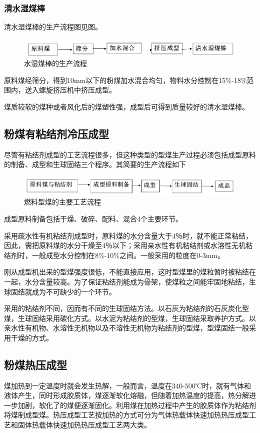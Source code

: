 \documentclass[10pt,openany]{ctexbook}
\begin{document}
\subsubsection{清水湿煤棒}
清水湿煤棒的生产流程图见图。
    \begin{figure}[!ht]
\includegraphics[scale=0.6]{26}
\caption{水湿煤棒的生产流程}
\end{figure}
原料煤经筛分，得到10mm以下的粉煤加水混合均匀，物料水分控制在15\%-18\%范围内，送入螺旋挤压机中挤压成型。\par
煤质较软的煤种或者风化后的煤塑性强，成型后可得到质量较好的清水湿煤棒。

 \subsection{粉煤有粘结剂冷压成型}
尽管有粘结剂成型的工艺流程很多，但这种类型的型煤生产过程必须包括成型原料的制备、成型和生球固结三个程序。其简要的生产流程如下
    \begin{figure}[!ht]
\includegraphics[scale=0.6]{27}
\caption{燃料型煤的主要工艺流程}
\end{figure}
成型原料制备包括干燥、破碎、配料、混合4个主要环节。 \par
采用疏水性有机粘结剂成型时，原料煤的水分含量大于4％时，就不能正常粘结，因此，需把原料煤的水分干燥至4％以下；采用亲水性有机粘结剂或水溶性无机粘结剂时，一般成型水分控制在8\%-10\%之间。一般采用的粒度在0-3mm。\par
    刚从成型机出来的型煤强度很低，不能直接应用，这时型煤里的煤粒暂时被粘结在一起，水分含量较高。为了保证粘结剂能成为骨架，使煤粒之间能牢固地粘结，生球固结就成为不可缺少的一个环节。\par
    采用的粘结剂不同，因而有不同的生球固结方法。以石灰为粘结剂的石灰炭化型煤，生球固结采用碳化方式。以水泥为粘结剂的型煤，生球固结采取养护方式。以亲水性有机物、水溶性无机物以及不溶性无机物为粘结剂的型煤，型煤固结一般采用干燥的方式。
 \subsection{粉煤热压成型}
 煤加热到一定温度时就会发生热解，一般而言，温度在340-500℃时，就有气体和液体产生，同时形成胶质体，煤逐渐软化熔融，但随着加热温度的提高，热分解进一步加剧，软化了的煤便逐渐固化。利用煤在加热过程中产生的胶质体作为粘结剂将煤制成型煤。热压成型工艺按加热的方式可分为气体热载体快速加热热压成型工艺和固体热载体快速加热热压成型工艺两大类。
\end{document}
